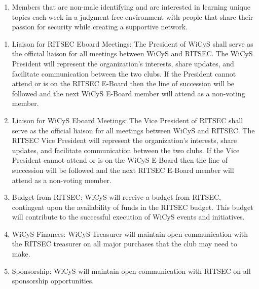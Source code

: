 

\begin{enumerate}
	\item Members that are non-male identifying and are interested in learning unique topics each week in a judgment-free environment with people that share their passion for security while creating a supportive network.
\end{enumerate}


\begin{enumerate}
      \item Liaison for RITSEC Eboard Meetings: The President of WiCyS shall serve as the official liaison for all meetings between WiCyS and RITSEC. The WiCyS President will represent the organization's interests, share updates, and facilitate communication between the two clubs. If the President cannot attend or is on the RITSEC E-Board then the line of succession will be followed and the next WiCyS E-Board member will attend as a non-voting member.
      \item Liaison for WiCyS Eboard Meetings: The Vice President of RITSEC shall serve as the official liaison for all meetings between WiCyS and RITSEC. The RITSEC Vice President will represent the organization's interests, share updates, and facilitate communication between the two clubs. If the Vice President cannot attend or is on the WiCyS E-Board then the line of succession will be followed and the next RITSEC E-Board member will attend as a non-voting member.
      \item Budget from RITSEC: WiCyS will receive a budget from RITSEC, contingent upon the availability of funds in the RITSEC budget. This budget will contribute to the successful execution of WiCyS events and initiatives.
      \item WiCyS Finances: WiCyS Treasurer will maintain open communication with the RITSEC treasurer on all major purchases that the club may need to make.
      \item Sponsorship: WiCyS will maintain open communication with RITSEC on all sponsorship opportunities.
\end{enumerate}